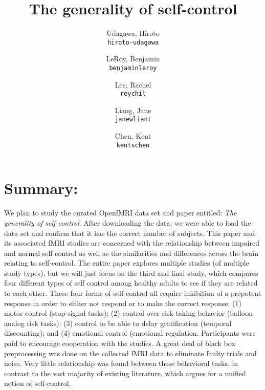 \documentclass[11pt]{article}
\title{The generality of self-control}
\author{
  Udagawa, Hiroto\\
  \texttt{hiroto-udagawa}
  \and
  LeRoy, Benjamin\\
  \texttt{benjaminleroy}
  \and
  Lee, Rachel\\
  \texttt{reychil}
  \and
  Liang, Jane\\
  \texttt{janewliant}
  \and
  Chen, Kent\\
  \texttt{kentschen}
}
\begin{document}
\maketitle

\section{Summary:}
We plan to study the curated OpenfMRI data set and paper entitled: \textit{The generality of self-control}. After downloading the data, we were able to load the data set and confirm that it has the correct number of subjects. This paper and its associated fMRI studies are concerned with the relationship between impaired and normal self control as well as the similarities and differences across the brain relating to self-control. The entire paper explores multiple studies (of multiple study types), but we will just focus on the third and final study, which compares four different types of self control among healthy adults to see if they are related to each other. These four forms of self-control all require inhibition of a prepotent response in order to either not respond or to make the correct response: (1) motor control (stop-signal tasks); (2) control over risk-taking behavior (balloon analog risk tasks); (3) control to be able to delay gratification (temporal discounting); and (4) emotional control (emotional regulation. Participants were paid to encourage cooperation with the studies. A great deal of black box preprocessing was done on the collected fMRI data to eliminate faulty trials and noise. Very little relationship was found between these behavioral tasks, in contrast to the vast majority of existing literature, which argues for a unified notion of self-control.
\end{document}
